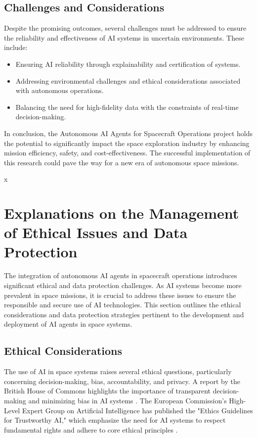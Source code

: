 \documentclass[a4paper,12pt]{article}
\begin{document}
\subsection{Challenges and Considerations}

Despite the promising outcomes, several challenges must be addressed to ensure the reliability and effectiveness of AI systems in uncertain environments. These include:

\begin{itemize}
    \item Ensuring AI reliability through explainability and certification of systems.
    \item Addressing environmental challenges and ethical considerations associated with autonomous operations.
    \item Balancing the need for high-fidelity data with the constraints of real-time decision-making.
\end{itemize}

In conclusion, the Autonomous AI Agents for Spacecraft Operations project holds the potential to significantly impact the space exploration industry by enhancing mission efficiency, safety, and cost-effectiveness. The successful implementation of this research could pave the way for a new era of autonomous space missions.



x
\section{Explanations on the Management of Ethical Issues and Data Protection}

The integration of autonomous AI agents in spacecraft operations introduces significant ethical and data protection challenges. As AI systems become more prevalent in space missions, it is crucial to address these issues to ensure the responsible and secure use of AI technologies. This section outlines the ethical considerations and data protection strategies pertinent to the development and deployment of AI agents in space systems.

\subsection{Ethical Considerations}

The use of AI in space systems raises several ethical questions, particularly concerning decision-making, bias, accountability, and privacy. A report by the British House of Commons highlights the importance of transparent decision-making and minimizing bias in AI systems \cite{house_of_commons_report}. The European Commission's High-Level Expert Group on Artificial Intelligence has published the "Ethics Guidelines for Trustworthy AI," which emphasize the need for AI systems to respect fundamental rights and adhere to core ethical principles \cite{ai_hleg_guidelines}.
\end{document}
